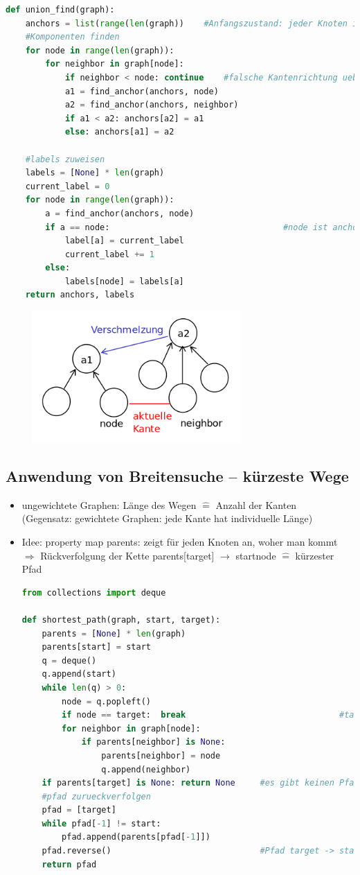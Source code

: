 \documentclass[11pt, fleqn]{scrreprt}
\begin{document}
			\begin{lstlisting}[language=Python]
def union_find(graph):
	anchors = list(range(len(graph))    #Anfangszustand: jeder Knoten ist Anker anchors[node] == node
	#Komponenten finden
	for node in range(len(graph)):
		for neighbor in graph[node]:
			if neighbor < node: continue    #falsche Kantenrichtung ueberspringen
			a1 = find_anchor(anchors, node)
			a2 = find_anchor(anchors, neighbor)
			if a1 < a2: anchors[a2] = a1
			else: anchors[a1] = a2

	#labels zuweisen
	labels = [None] * len(graph)
	current_label = 0
	for node in range(len(graph)):
		a = find_anchor(anchors, node)
		if a == node:       							#node ist anchor
			label[a] = current_label
			current_label += 1
		else:
			labels[node] = labels[a]
	return anchors, labels
			\end{lstlisting}
	\begin{center}
		\includegraphics[width=10cm,height=5cm,keepaspectratio]{./Pictures/Verschmelzung.png}
	\end{center}
	
			
	\subsection*{Anwendung von Breitensuche – kürzeste Wege}
	\begin{itemize}
		\item ungewichtete Graphen: Länge des Wegen $\widehat{=}$ Anzahl der Kanten \\
		(Gegensatz: gewichtete Graphen: jede Kante hat individuelle Länge)
		\item Idee: property map parents: zeigt für jeden Knoten an, woher man kommt \\
		$\Rightarrow$ Rückverfolgung der Kette parents[target] $\rightarrow$ startnode $\widehat{=}$ kürzester Pfad
		\begin{lstlisting}[language=Python]
from collections import deque

def shortest_path(graph, start, target):
	parents = [None] * len(graph)
	parents[start] = start
	q = deque()
	q.append(start)
	while len(q) > 0:
		node = q.popleft()
		if node == target:  break   							#target gefunden => Schleife beenden
		for neighbor in graph[node]:
			if parents[neighbor] is None:
				parents[neighbor] = node
				q.append(neighbor)
	if parents[target] is None: return None     #es gibt keinen Pfad
	#pfad zurueckverfolgen
	pfad = [target]
	while pfad[-1] != start:
		pfad.append(parents[pfad[-1]])
	pfad.reverse()  							#Pfad target -> start in start->target umwandeln
	return pfad
		\end{lstlisting}
	\end{itemize}
\end{document}
